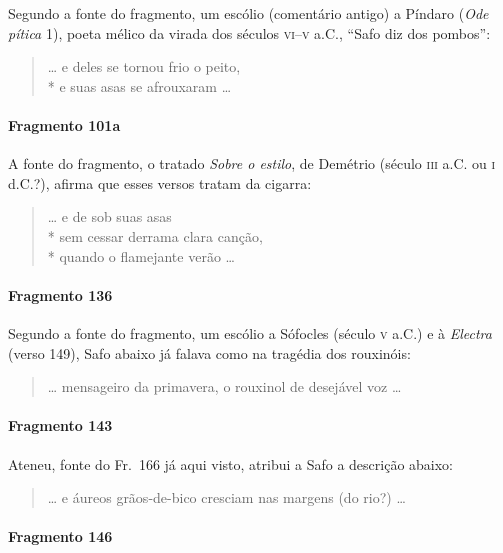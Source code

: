 {\small Segundo a fonte do fragmento, um escólio (comentário antigo) a Píndaro
(\textit{Ode pítica} 1), poeta mélico da virada dos séculos \textsc{vi}--\textsc{v} a.C.,
``Safo diz dos pombos”:}

\begin{verse}
\ldots{} e deles se tornou frio o peito,\\*
e suas asas se afrouxaram \ldots{}
\end{verse}

\paragraph{Fragmento 101a}

{\small A fonte do fragmento, o tratado \textit{Sobre o estilo}, de Demétrio (século \textsc{iii}
a.C. ou \textsc{i} d.C.?), afirma que esses versos tratam da cigarra:}

\begin{verse}
\ldots{} e de sob suas asas\\*
sem cessar derrama clara canção,\\*
quando o flamejante verão \ldots{}
\end{verse}

\paragraph{Fragmento 136}

{\small Segundo a fonte do fragmento, um escólio a Sófocles (século \textsc{v} a.C.) e à
\textit{Electra }(verso 149), Safo abaixo já falava como na tragédia dos
rouxinóis:}

\begin{verse}
\ldots{} mensageiro da primavera, o rouxinol de \qb{}desejável voz \ldots{}
\end{verse}

\paragraph{Fragmento 143}

{\small Ateneu, fonte do Fr.~166 já aqui visto, atribui a Safo a descrição abaixo:}

\begin{verse}
\ldots{} e áureos grãos-de-bico cresciam nas \qb{}margens (do rio?) \ldots{}
\end{verse}

\paragraph{Fragmento 146}

